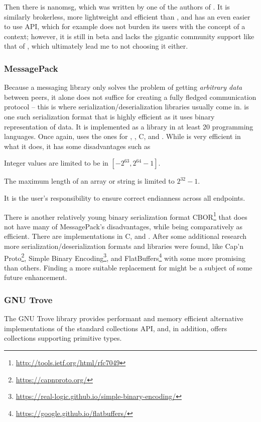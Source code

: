 Then there is {\small nanomsg}\cite{nanomsg}, which was written by one of the authors of \zmq. 
It is similarly brokerless, more lightweight and efficient than \zmq, and has an even easier to use API, which
for example does not burden its users with the concept of a context; however, it is still in beta and lacks
the gigantic community support like that of \zmq, which ultimately lead me to not choosing it either.
\tocless\subsubsection{MessagePack}
\label{sec:msgpack}
Because a messaging library only solves the problem of getting \emph{arbitrary data} between peers, it 
alone does not suffice for creating a fully fledged communication protocol -- this is where
serialization/deserialization libraries usually come in. \msgpack{}\cite{msgpack} is one such serialization
format that is highly efficient as it uses binary representation of data. It is implemented as a library in at
least 20 programming languages. Once again, \xmlmate uses the ones for \java, \python, {\small C}, and \cpp.
While \msgpack is very efficient in what it does, it has some disadvantages such as 
\begin{itemize*}
  \item Integer values are limited to be in $[-2^{63}, 2^{64}-1]$.
  \item The maximum length of an array or string is limited to $2^{32}-1$.
  \item It is the user's responsibility to ensure correct endianness across all endpoints.
\end{itemize*}

There is another relatively young binary serialization format
{\small CBOR}\footnote{\url{http://tools.ietf.org/html/rfc7049}} that does not have many of {\small
MessagePack's} disadvantages, while being comparatively as efficient.
There are implementations in {\small C}, \python and \java. 
After some additional research more serialization/deserialization formats and libraries were found, like
{\small Cap'n Proto}\footnote{\url{https://capnproto.org/}},
{\small Simple Binary Encoding}\footnote{\url{https://real-logic.github.io/simple-binary-encoding/}}, and
{\small FlatBuffers}\footnote{\url{https://google.github.io/flatbuffers/}} with some more promising than
others. Finding a more suitable replacement for \msgpack might be a subject of some future enhancement.
\tocless\subsubsection{GNU Trove}
\label{sec:trove}
The GNU Trove \java library provides performant and memory efficient alternative implementations of the
standard \java collections API, and, in addition, offers collections supporting primitive types. 

